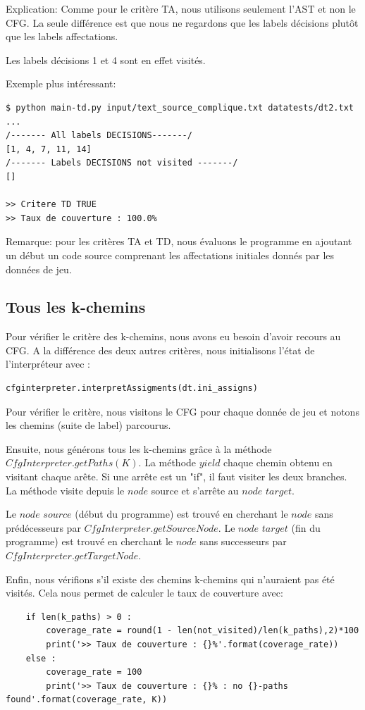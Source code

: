 \documentclass[a4paper]{article}
\begin{document}
Explication: 
Comme pour le critère TA, nous utilisons seulement l'AST et non le CFG. La seule différence est que nous ne regardons que les labels décisions plutôt que les labels affectations. 

Les labels décisions 1 et 4 sont en effet visités. 

Exemple plus intéressant:
\begin{verbatim}
$ python main-td.py input/text_source_complique.txt datatests/dt2.txt
...
/------- All labels DECISIONS-------/
[1, 4, 7, 11, 14]
/------- Labels DECISIONS not visited -------/
[]

>> Critere TD TRUE
>> Taux de couverture : 100.0%

\end{verbatim}

Remarque: pour les critères TA et TD, nous évaluons le programme en ajoutant un début un code source comprenant les affectations initiales donnés par les données de jeu. 

\subsection{Tous les k-chemins}

Pour vérifier le critère des k-chemins, nous avons eu besoin d'avoir recours au CFG. A la différence des deux autres critères, nous initialisons l'état de l’interpréteur avec :
\begin{verbatim}
cfginterpreter.interpretAssigments(dt.ini_assigns)
\end{verbatim}

Pour vérifier le critère, nous visitons le CFG pour chaque donnée de jeu et notons les chemins (suite de label) parcourus. 

Ensuite, nous générons tous les k-chemins grâce à la méthode $CfgInterpreter.getPaths(K)$. La méthode $yield$ chaque chemin obtenu en visitant chaque arête. Si une arrête est un "if", il faut visiter les deux branches. La méthode visite depuis le $node$ source et s'arrête au $node$ $target$.

Le $node$ $source$ (début du programme) est trouvé en cherchant le $node$ sans prédécesseurs par $CfgInterpreter.getSourceNode$.
Le $node$ $target$ (fin du programme) est trouvé en cherchant le $node$ sans successeurs par $CfgInterpreter.getTargetNode$.

Enfin, nous vérifions s'il existe des chemins k-chemins qui n'auraient pas été visités. Cela nous permet de calculer le taux de couverture avec:
\begin{verbatim}
    if len(k_paths) > 0 :
        coverage_rate = round(1 - len(not_visited)/len(k_paths),2)*100
        print('>> Taux de couverture : {}%'.format(coverage_rate))
    else :
        coverage_rate = 100
        print('>> Taux de couverture : {}% : no {}-paths found'.format(coverage_rate, K))
\end{verbatim}
\end{document}
